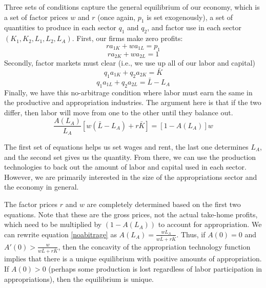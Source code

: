 Three sets of conditions capture the general equilibrium of our economy, which is a set of factor prices $w$ and $r$ (once again, $p_1$ is set exogenously), a set of quantities to produce in each sector $q_1$ and $q_2$, and factor use in each sector $(K_1,K_2,L_1,L_2,L_A)$. First, our firms make zero profits:
\begin{equation}\label{eq:p_1rw}
    ra_{1K} + wa_{1L} = p_1
\end{equation}
\begin{equation}\label{eq:rw2}
    ra_{2K} + wa_{2L} = 1
\end{equation}
Secondly, factor markets must clear (i.e., we use up all of our labor and capital)
\begin{equation}\label{eq:Kclear}
    q_1 a_{1K} + q_2 a_{2K} = \bar{K}
\end{equation}
\begin{equation}\label{eq:Lclear}
    q_1 a_{1L} + q_2 a_{2L} =\bar{L} - L_A
\end{equation}
Finally, we have this no-arbitrage condition where labor must earn the same in the productive and appropriation industries. The argument here is that if the two differ, then labor will move from one to the other until they balance out.
\begin{equation}\label{noabitrage}
    \frac{A(L_A)}{L_A}[w(\bar{L} - L_A) + r\bar{K}] = [1 - A(L_A)]w
\end{equation}

The first set of equations helps us set wages and rent, the last one determines $L_A$, and the second set gives us the quantity. From there, we can use the production technologies to back out the amount of labor and capital used in each sector. However, we are primarily interested in the size of the appropriations sector and the economy in general.

The factor prices $r$ and $w$ are completely determined based on the first two equations. Note that these are the gross prices, not the actual take-home profits, which need to be multiplied by $(1 - A(L_A))$ to account for appropriation. We can rewrite equation \ref{noabitrage} as $A(L_A) = \frac{wL_A}{w\bar{L} + r\bar{K}}$. Thus, if $A(0) = 0$ and $A'(0) >\frac{w}{w\bar{L} + r\bar{K}}$, then the concavity of the appropriation technology function implies that there is a unique equilibrium with positive amounts of appropriation. If $A(0) > 0$ (perhaps some production is lost regardless of labor participation in appropriations), then the equilibrium is unique.


